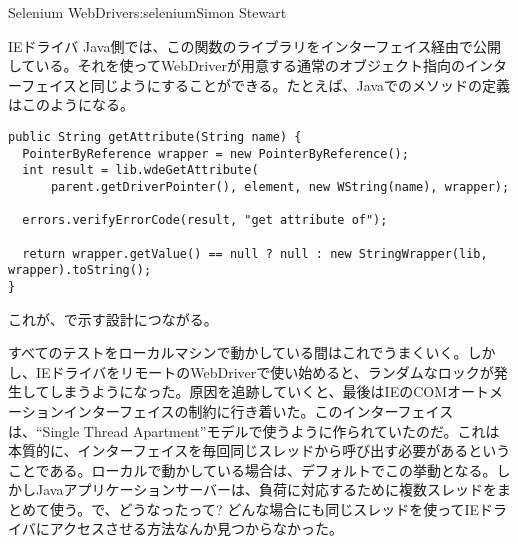 \begin{aosachapter}{Selenium WebDriver}{s:selenium}{Simon Stewart}
\begin{aosasect1}{IEドライバ}
Java側では、この関数のライブラリをインターフェイス経由で公開している。それを使ってWebDriverが用意する通常のオブジェクト指向のインターフェイスと同じようにすることができる。たとえば、Javaでのメソッドの定義はこのようになる。

\begin{verbatim}
public String getAttribute(String name) {
  PointerByReference wrapper = new PointerByReference();
  int result = lib.wdeGetAttribute(
      parent.getDriverPointer(), element, new WString(name), wrapper);

  errors.verifyErrorCode(result, "get attribute of");

  return wrapper.getValue() == null ? null : new StringWrapper(lib, wrapper).toString();
}
\end{verbatim}

\noindent これが、で示す設計につながる。


すべてのテストをローカルマシンで動かしている間はこれでうまくいく。しかし、IEドライバをリモートのWebDriverで使い始めると、ランダムなロックが発生してしまうようになった。原因を追跡していくと、最後はIEのCOMオートメーションインターフェイスの制約に行き着いた。このインターフェイスは、``Single Thread Apartment''モデルで使うように作られていたのだ。これは本質的に、インターフェイスを毎回同じスレッドから呼び出す必要があるということである。ローカルで動かしている場合は、デフォルトでこの挙動となる。しかしJavaアプリケーションサーバーは、負荷に対応するために複数スレッドをまとめて使う。で、どうなったって? どんな場合にも同じスレッドを使ってIEドライバにアクセスさせる方法なんか見つからなかった。


\end{aosasect1}
\end{aosachapter}
